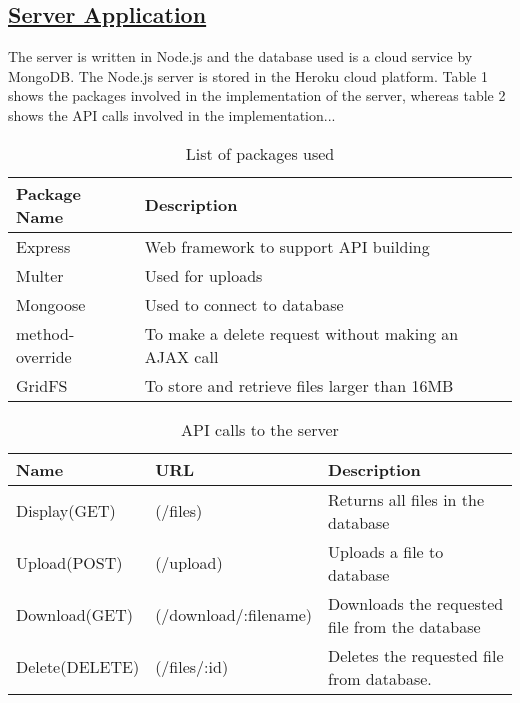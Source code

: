 \documentclass{article}
\begin{document}
\subsection{\underline{Server Application}}
The server is written in Node.js and the database used is a cloud service by MongoDB. The Node.js server is stored in the Heroku cloud platform. Table 1 shows the packages involved in the implementation of the server, whereas table 2 shows the API calls involved in the implementation...
\begin{table}[h!]
\begin {center}
\captionsetup{justification=centering}
\caption{List of packages used}
\begin{tabular}{| l | l |}
\hline
\textbf{Package Name} & \textbf{Description}\\
\hline
Express & Web framework to support API building\\
\hline
Multer & Used for uploads\\
\hline
Mongoose & Used to connect to database\\
\hline
method-override & To make a delete request without making an AJAX call\\
\hline
GridFS & To store and retrieve files larger than 16MB\\
\hline
\end{tabular}
\end{center}
\end{table}


\begin{table}[h!]
\begin {center}
\captionsetup{justification=centering}
\caption{API calls to the server}
\begin{tabular}{| l | l | l |}
\hline
\textbf{Name} & \textbf{URL} & \textbf{Description}\\
\hline
Display(GET) & (/files) & Returns all files in the database\\
\hline
Upload(POST) & (/upload) & Uploads a file to database\\
\hline
Download(GET) & (/download/:filename) & Downloads the requested file from the database\\
\hline
Delete(DELETE) & (/files/:id)  & Deletes the requested file from database.\\
\hline
\end{tabular}
\end{center}
\end{table}
\end{document}
